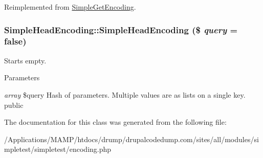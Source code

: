 Reimplemented from \hyperlink{class_simple_get_encoding_ab8adaa71183f17a87edbcc7d27827861}{SimpleGetEncoding}.\hypertarget{class_simple_head_encoding_a6e727e185e5b64646236a395959aaaf6}{
\subsubsection[{SimpleHeadEncoding}]{\setlength{\rightskip}{0pt plus 5cm}SimpleHeadEncoding::SimpleHeadEncoding (\$ {\em query} = {\ttfamily false})}}
\label{class_simple_head_encoding_a6e727e185e5b64646236a395959aaaf6}
Starts empty. 
\begin{DoxyParams}{Parameters}
\item[{\em array}]\$query Hash of parameters. Multiple values are as lists on a single key.  public \end{DoxyParams}


The documentation for this class was generated from the following file:\begin{DoxyCompactItemize}
\item 
/Applications/MAMP/htdocs/drump/drupalcodedump.com/sites/all/modules/simpletest/simpletest/encoding.php\end{DoxyCompactItemize}
